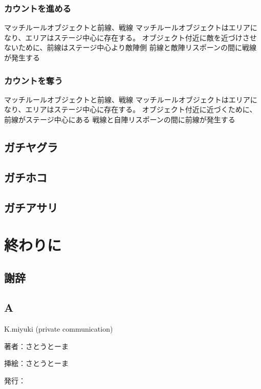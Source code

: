\documentclass[a4paper,11pt]{jsbook}
\begin{document}
\section{カウントを進める}
マッチルールオブジェクトと前線、戦線
マッチルールオブジェクトはエリアになり、エリアはステージ中心に存在する。
オブジェクト付近に敵を近づけさせないために、前線はステージ中心より敵陣側
前線と敵陣リスポーンの間に戦線が発生する

\section{カウントを奪う}
マッチルールオブジェクトと前線、戦線
マッチルールオブジェクトはエリアになり、エリアはステージ中心に存在する。
オブジェクト付近に近づくために、前線がステージ中心にある
戦線と自陣リスポーンの間に前線が発生する


\chapter{ガチヤグラ}
\chapter{ガチホコ}
\chapter{ガチアサリ}

\part{終わりに}
\chapter{謝辞}

\appendix
\chapter{A}



\begin{thebibliography}{2}

K.miyuki (private communication)
\end{thebibliography}

\thispagestyle{empty}
\begin{flushright}
\begin{minipage}{0.5\hsize}
\begin{description}
  \item{著者：}さとうとーま
  \item{挿絵：}さとうとーま
  \item{発行：}\date{\today}
\end{description}
\end{minipage}
\end{flushright}
\end{document}
